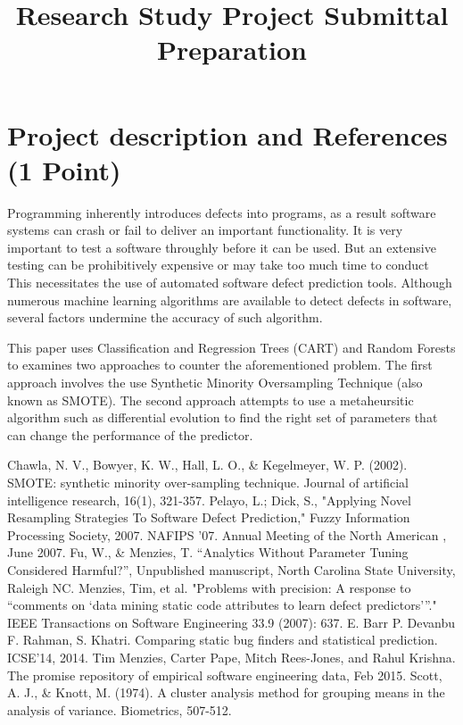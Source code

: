 \documentclass[12pt, journal, onecolumn]{IEEEtran}
\begin{document}
  \title{Research Study Project Submittal Preparation}
  
    \maketitle
    \section{Project description and References (1 Point)}
      \noindent Programming inherently introduces defects into programs, as a result software systems can crash or fail to deliver an important functionality. It is very important to test a software throughly before it can be used. But an extensive testing can be prohibitively expensive or may take too much time to conduct This necessitates the use of automated software defect prediction tools. Although numerous machine learning algorithms are available to detect defects in software, several factors undermine the accuracy of such algorithm. 
      
      This paper uses Classification and Regression Trees (CART) and Random Forests to examines two approaches to counter the aforementioned problem. The first approach involves the use Synthetic Minority Oversampling Technique (also known as SMOTE). The second approach attempts to use a metaheursitic algorithm such as differential evolution to find the right set of parameters that can change the performance of the predictor.
 
\begin{thebibliography}{10}
Chawla, N. V., Bowyer, K. W., Hall, L. O., \& Kegelmeyer, W. P. (2002). SMOTE: synthetic minority over-sampling technique. Journal of artificial intelligence research, 16(1), 321-357.
Pelayo, L.; Dick, S., "Applying Novel Resampling Strategies To Software Defect Prediction," Fuzzy Information Processing Society, 2007. NAFIPS '07. Annual Meeting of the North American , June 2007.
Fu, W., \& Menzies, T. ``Analytics Without Parameter Tuning Considered Harmful?'', Unpublished manuscript, North Carolina State University, Raleigh NC.
Menzies, Tim, et al. "Problems with precision: A response to “comments on ‘data mining static code attributes to learn defect predictors’”." IEEE Transactions on Software Engineering 33.9 (2007): 637.
E. Barr P. Devanbu F. Rahman, S. Khatri. Comparing static bug finders and
statistical prediction. ICSE’14, 2014.
Tim Menzies, Carter Pape, Mitch Rees-Jones, and Rahul Krishna. The promise repository of empirical software engineering data, Feb 2015.
Scott, A. J., \& Knott, M. (1974). A cluster analysis method for grouping means in the analysis of variance. Biometrics, 507-512.
\end{thebibliography}
\newpage
\end{document}

